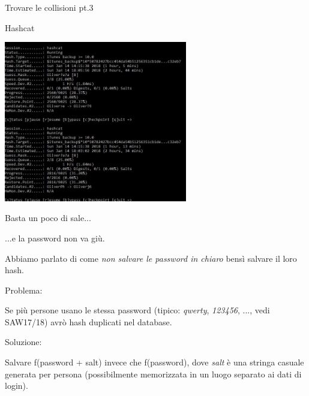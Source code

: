 \documentclass[xcolor=dvipsnames,aspectratio=169]{beamer}
\begin{document}
\begin{frame}{Trovare le collisioni pt.3}

    Hashcat
    
    \medskip
    
    \centering\includegraphics[width=8cm]{img/hashcat}
    
\end{frame}
    
\begin{frame}{Basta un poco di sale...}
  
  ...e la password non va giù.
  
  \medskip

  \pause
  Abbiamo parlato di come \textit{non salvare le password in chiaro} bensì salvare il loro hash.
  
  \medskip
  \pause

  Problema: 
  
  Se più persone usano le stessa password (tipico: \textit{qwerty}, \textit{123456}, ..., vedi SAW17/18) avrò hash duplicati nel database.
  
  \medskip
  \pause
  Soluzione: 
  
  Salvare f(password + salt) invece che f(password), dove \textit{salt} è una stringa casuale generata per persona (possibilmente memorizzata in un luogo separato ai dati di login).
  
\end{frame}
\end{document}
